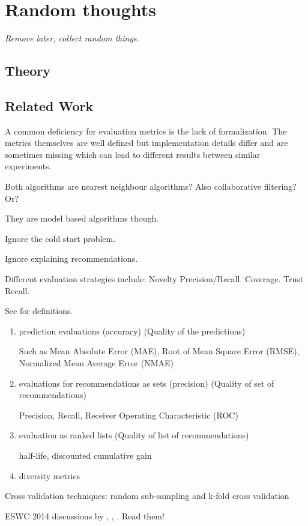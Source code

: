 \chapter{Random thoughts}

\textit{Remove later, collect random things.}


\section{Theory}

\section{Related Work}

A common deficiency for evaluation metrics is the lack of formalization. The metrics themselves are well defined but implementation details differ and are sometimes missing which can lead to different results between similar experiments.


Both algorithms are nearest neighbour algorithms? Also collaborative filtering? Or?

They are model based algorithms though.

Ignore the cold start problem.

Ignore explaining recommendations.

Different evaluation strategies include: Novelty Precision/Recall. Coverage. Trust Recall.

See \citep{bobadilla2013recommender} for definitions.

\begin{enumerate}
    \item prediction evaluations (accuracy) (Quality of the predictions)

        Such as Mean Absolute Error (MAE), Root of Mean Square Error (RMSE), Normalized Mean Average Error (NMAE)

    \item evaluations for recommendations as sets (precision) (Quality of set of recommendations)

        Precision, Recall, Receiver Operating Characteristic (ROC)

    \item evaluation as ranked lists (Quality of list of recommendations)

        half-life, discounted cumulative gain

    \item diversity metrics
\end{enumerate}

Cross validation techniques:
    random sub-sampling and k-fold cross validation

ESWC 2014 discussions by \citep{di2014linked}, \citep{heitmann2014semstim}, \citep{ostuni2014linked}. Read them!


